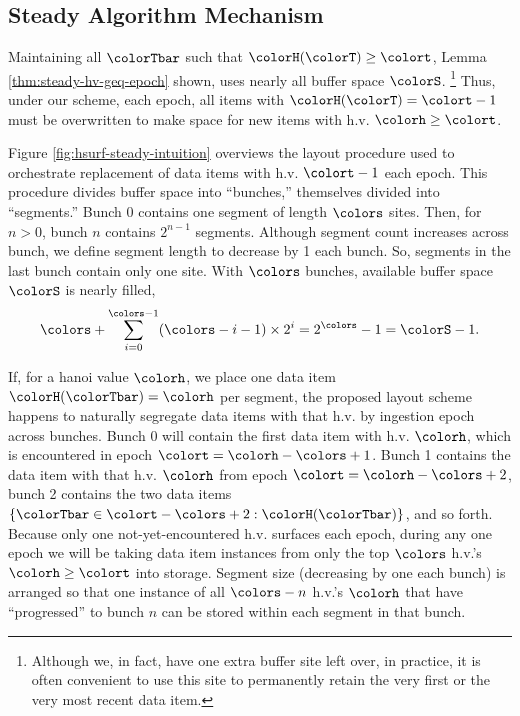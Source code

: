 

\subsection{Steady Algorithm Mechanism}
\label{sec:steady-mechanism}



Maintaining all $\colorTbar$ such that $\colorH(\colorT) \geq \colort$, Lemma \ref{thm:steady-hv-geq-epoch} shown, uses nearly all buffer space $\colorS$.%
\footnote{%
Although we, in fact, have one extra buffer site left over, in practice, it is often convenient to use this site to permanently retain the very first or the very most recent data item.%
}
Thus, under our scheme, each epoch, all items with $\colorH(\colorT) = \colort - 1$ must be overwritten to make space for new items with h.v. $\colorh \geq \colort$.

Figure \ref{fig:hsurf-steady-intuition} overviews the layout procedure used to orchestrate replacement of data items with h.v. $\colort - 1$ each epoch.
This procedure divides buffer space into ``bunches,'' themselves divided into ``segments.''
Bunch 0 contains one segment of length $\colors$ sites.
Then, for $n > 0$, bunch $n$ contains $2^{n-1}$ segments.
Although segment count increases across bunch, we define segment length to decrease by 1 each bunch.
So, segments in the last bunch contain only one site.
With $\colors$ bunches, available buffer space $\colorS$ is nearly filled,
\begin{align*}
\colors + \sum_{i=0}^{\colors-1} (\colors - i - 1) \times 2^{i} = 2^{\colors} - 1 = \colorS - 1.
\end{align*}

If, for a hanoi value $\colorh$, we place one data item $\colorH(\colorTbar) = \colorh$ per segment, the proposed layout scheme happens to naturally segregate data items with that h.v. by ingestion epoch across bunches.
Bunch 0 will contain the first data item with h.v. $\colorh$, which is encountered in epoch $\colort=\colorh - \colors + 1$.
Bunch 1 contains the data item with that h.v. $\colorh$ from epoch $\colort=\colorh - \colors + 2$, bunch 2 contains the two data items $\{ \colorTbar \in \colort - \colors + 2 : \colorH(\colorTbar) \}$, and so forth.
Because only one not-yet-encountered h.v. surfaces each epoch, during any one epoch we will be taking data item instances from only the top $\colors$ h.v.'s $\colorh \geq \colort$ into storage.
Segment size (decreasing by one each bunch) is arranged so that one instance of all $\colors - n$ h.v.'s $\colorh$ that have ``progressed'' to bunch $n$ can be stored within each segment in that bunch.

